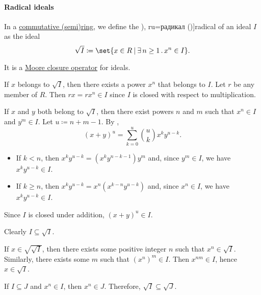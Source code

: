 \paragraph{Radical ideals}

\begin{definition}\label{def:radical_of_ideal}\cite[def. VII.2.13]{Aluffi2009}
  In a \hyperref[def:ring/commutative]{commutative (semi)ring}, we define the \term[bg=радикал (\cite[15]{КоцевСидеров2016}), ru=радикал (\cite[173]{Костиркин1968Ленг})]{radical} of an ideal \( I \) as the ideal
  \begin{equation}\label{eq:def:radical_ideal}
    \sqrt I \coloneqq \set{ x \in R \given \qexists {n \geq 1} x^n \in I }.
  \end{equation}

  It is a \hyperref[def:moore_closure_operator]{Moore closure operator} for ideals.
\end{definition}
\begin{defproof}

   If \( x \) belongs to \( \sqrt I \), then there exists a power \( x^n \) that belongs to \( I \). Let \( r \) be any member of \( R \). Then \( rx = rx^n \in I \) since \( I \) is closed with respect to multiplication.

   If \( x \) and \( y \) both belong to \( \sqrt I \), then there exist powers \( n \) and \( m \) such that \( x^n \in I \) and \( y^m \in I \). Let \( u \coloneqq n + m - 1 \). By ,
  \begin{equation*}
    (x + y)^u = \sum_{k=0}^u \binom u k x^k y^{u-k}.
  \end{equation*}

  \begin{itemize}
    \item If \( k < n \), then \( x^k y^{u-k} = (x^k y^{n - k - 1}) y^m \) and, since \( y^m \in I \), we have \( x^k y^{u-k} \in I \).
    \item If \( k \geq n \), then \( x^k y^{u-k} = x^n (x^{k-n} y^{u-k}) \) and, since \( x^n \in I \), we have \( x^k y^{u-k} \in I \).
  \end{itemize}

  Since \( I \) is closed under addition, \( (x + y)^u \in I \).


   Clearly \( I \subseteq \sqrt I \).

   If \( x \in \sqrt {\sqrt I} \), then there exists some positive integer \( n \) such that \( x^n \in \sqrt I \). Similarly, there exists some \( m \) such that \( (x^n)^m \in I \). Then \( x^{nm} \in I \), hence \( x \in \sqrt I \).

   If \( I \subseteq J \) and \( x^n \in I \), then \( x^n \in J \). Therefore, \( \sqrt I \subseteq \sqrt J \).
\end{defproof}

